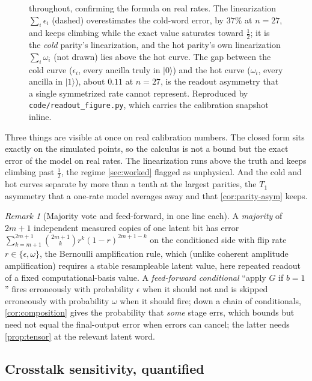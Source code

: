 \documentclass[11pt]{article}
\numberwithin{equation}{section}
\theoremstyle{plain}
\theoremstyle{definition}
\theoremstyle{remark}
\newtheorem{remark}[theorem]{Remark}
\newcommand{\eps}{\epsilon}
\newcommand{\ket}[1]{\lvert #1 \rangle}
\begin{document}
\begin{figure}[t]
{throughout, confirming the formula on real rates. The linearization
$\sum_i \eps_i$ (dashed) overestimates the cold-word error, by $37\%$ at $n=27$,
and keeps climbing while the exact value saturates toward $\tfrac12$; it is the
\emph{cold} parity's linearization, and the hot parity's own linearization
$\sum_i \omega_i$ (not drawn) lies above the hot curve. The gap
between the cold curve ($\eps_i$, every ancilla truly in $\ket{0}$) and the hot
curve ($\omega_i$, every ancilla in $\ket{1}$), about $0.11$ at $n=27$, is the
readout asymmetry that a single symmetrized rate cannot represent. Reproduced by
\texttt{code/readout\_figure.py}, which carries the calibration snapshot inline.}
\label{fig:realcalib}
\end{figure}

Three things are visible at once on real calibration numbers. The closed form sits exactly
on the simulated points, so the calculus is not a bound but the exact error of the
model on real rates. The linearization runs above the truth and keeps climbing
past $\tfrac12$, the regime \cref{sec:worked} flagged as unphysical. And the cold
and hot curves separate by more than a tenth at the largest parities, the $T_1$
asymmetry that a one-rate model averages away and that \cref{cor:parity-asym}
keeps.

\begin{remark}[Majority vote and feed-forward, in one line each]
A \emph{majority} of $2m+1$ independent measured copies of one latent bit has
error $\sum_{k=m+1}^{2m+1}\binom{2m+1}{k} r^k (1-r)^{2m+1-k}$ on the conditioned
side with flip rate $r\in\{\eps,\omega\}$, the Bernoulli amplification rule,
which (unlike coherent amplitude amplification) requires a stable resampleable
latent value, here repeated readout of a fixed computational-basis value.
A \emph{feed-forward conditional} ``apply $G$ if $b=1$'' fires erroneously with
probability $\eps$ when it should not and is skipped erroneously with probability
$\omega$ when it should fire; down a chain of conditionals,
\cref{cor:composition} gives the probability that \emph{some} stage errs, which
bounds but need not equal the final-output error when errors can cancel; the
latter needs \cref{prop:tensor} at the relevant latent word.
\end{remark}

\subsection{Crosstalk sensitivity, quantified}
\label{sec:worked-crosstalk}
\end{document}
